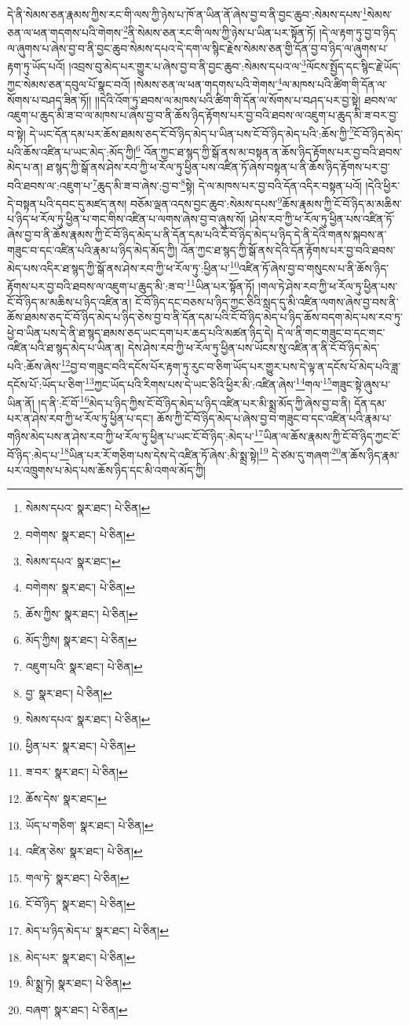 དེ་ནི་སེམས་ཅན་རྣམས་ཀྱིས་རང་གི་ལས་ཀྱི་ཉེས་པ་ཁོ་ན་ཡིན་ནོ་ཞེས་བྱ་བ་ནི་བྱང་ཆུབ་:སེམས་དཔས་\footnote{སེམས་དཔའ་  སྣར་ཐང་།  པེ་ཅིན། }སེམས་ཅན་ལ་ཕན་གདགས་པའི་གེགས་\footnote{བགེགས་  སྣར་ཐང་།  པེ་ཅིན། }ནི་སེམས་ཅན་རང་གི་ལས་ཀྱི་ཉེས་པ་ཡིན་པར་སྟོན་ཏོ། །དེ་ལ་རྟག་ཏུ་བྱ་བ་ཉིད་ལ་ཞུགས་པ་ཞེས་བྱ་བ་ནི་བྱང་ཆུབ་སེམས་དཔའ་དེ་དག་ལ་སྙིང་རྗེས་སེམས་ཅན་གྱི་དོན་བྱ་བ་ཉིད་ལ་ཞུགས་པ་རྟག་ཏུ་ཡོད་པའོ། །འབྲས་བུ་མེད་པར་གྱུར་པ་ཞེས་བྱ་བ་ནི་བྱང་ཆུབ་:སེམས་དཔའ་ལ་\footnote{སེམས་དཔའ་  སྣར་ཐང་། }ལོངས་སྤྱོད་དང་སྙིང་རྗེ་ཡོད་ཀྱང་སེམས་ཅན་དབུལ་པོ་སྣང་བའོ། །སེམས་ཅན་ལ་ཕན་གདགས་པའི་གེགས་\footnote{བགེགས་  སྣར་ཐང་།  པེ་ཅིན། }ལ་མཁས་པའི་ཚིག་གི་དོན་ལ་སོགས་པ་བཤད་ཟིན་ཏོ།། །།དེའི་འོག་ཏུ་ཐབས་ལ་མཁས་པའི་ཚིག་གི་དོན་ལ་སོགས་པ་བཤད་པར་བྱ་སྟེ། ཐབས་ལ་འཇུག་པ་ཆུད་མི་ཟ་བ་ལ་མཁས་པ་ཞེས་བྱ་བ་ནི་ཆོས་ཉིད་རྟོགས་པར་བྱ་བའི་ཐབས་ལ་འཇུག་པ་ཆུད་མི་ཟ་བར་བྱ་བ་སྟེ། དེ་ཡང་དོན་དམ་པར་ཆོས་ཐམས་ཅད་ངོ་བོ་ཉིད་མེད་པ་ཡིན་པས་ངོ་བོ་ཉིད་མེད་པའི་:ཆོས་ཀྱི་\footnote{ཆོས་ཀྱིས་  སྣར་ཐང་།  པེ་ཅིན། }ངོ་བོ་ཉིད་མེད་པའི་ཆོས་འཛིན་པ་ཡང་མེད་:མོད་ཀྱི།\footnote{མོད་ཀྱིས།  སྣར་ཐང་།  པེ་ཅིན། } འོན་ཀྱང་ཐ་སྙད་ཀྱི་སྒོ་ནས་མ་བསྟན་ན་ཆོས་ཉིད་རྟོགས་པར་བྱ་བའི་ཐབས་མེད་པ་ན། ཐ་སྙད་ཀྱི་སྒོ་ནས་ཤེས་རབ་ཀྱི་ཕ་རོལ་ཏུ་ཕྱིན་པས་འཛིན་ཏོ་ཞེས་བསྟན་པ་ནི་ཆོས་ཉིད་རྟོགས་པར་བྱ་བའི་ཐབས་ལ་:འཇུག་པ་\footnote{འཇུག་པའི་  སྣར་ཐང་།  པེ་ཅིན། }ཆུད་མི་ཟ་བ་ཞེས་:བྱ་བ་\footnote{བྱ་  སྣར་ཐང་།  པེ་ཅིན། }སྟེ། དེ་ལ་མཁས་པར་བྱ་བའི་དོན་འདིར་བསྟན་པའོ། །དེའི་ཕྱིར་དེ་བསྟན་པའི་དབང་དུ་མཛད་ནས། བཅོམ་ལྡན་འདས་བྱང་ཆུབ་:སེམས་དཔས་\footnote{སེམས་དཔའ་  སྣར་ཐང་།  པེ་ཅིན། }ཆོས་རྣམས་ཀྱི་ངོ་བོ་ཉིད་མ་མཆིས་པ་ཉིད་ཕ་རོལ་ཏུ་ཕྱིན་པ་གང་གིས་འཛིན་པ་ལགས་ཞེས་བྱ་བ་ཞུས་སོ། །ཤེས་རབ་ཀྱི་ཕ་རོལ་ཏུ་ཕྱིན་པས་འཛིན་ཏོ་ཞེས་བྱ་བ་ནི་ཆོས་རྣམས་ཀྱི་ངོ་བོ་ཉིད་མེད་པ་ནི་དོན་དམ་པའི་ངོ་བོ་ཉིད་མེད་པ་ཉིད་དེ་ནི་དེའི་གནས་སྐབས་ན་གཟུང་བ་དང་འཛིན་པའི་རྣམ་པ་ཉིད་མེད་མོད་ཀྱི། འོན་ཀྱང་ཐ་སྙད་ཀྱི་སྒོ་ནས་དེའི་དོན་རྟོགས་པར་བྱ་བའི་ཐབས་མེད་པས་འདིར་ཐ་སྙད་ཀྱི་སྒོ་ནས་ཤེས་རབ་ཀྱི་ཕ་རོལ་ཏུ་:ཕྱིན་པ་\footnote{ཕྱིན་པར་  སྣར་ཐང་།  པེ་ཅིན། }འཛིན་ཏོ་ཞེས་བྱ་བ་གསུངས་པ་ནི་ཆོས་ཉིད་རྟོགས་པར་བྱ་བའི་ཐབས་ལ་འཇུག་པ་ཆུད་མི་:ཟ་བ་\footnote{ཟ་བར་  སྣར་ཐང་།  པེ་ཅིན། }ཡིན་པར་སྟོན་ཏོ། །གལ་ཏེ་ཤེས་རབ་ཀྱི་ཕ་རོལ་ཏུ་ཕྱིན་པས་ངོ་བོ་ཉིད་མ་མཆིས་པ་ཉིད་འཛིན་ན། ངོ་བོ་ཉིད་དང་བཅས་པ་ཉིད་ཀྱང་ཅིའི་སླད་དུ་མི་འཛིན་ལགས་ཞེས་བྱ་བས་ནི་ཆོས་ཐམས་ཅད་ངོ་བོ་ཉིད་མེད་པ་ཉིད་ཅེས་བྱ་བ་ནི་དོན་དམ་པའི་ངོ་བོ་ཉིད་མེད་པ་ཉིད་ཆོས་བདག་མེད་པས་རབ་ཏུ་ཕྱེ་བ་ཡིན་པས་དེ་ནི་ཐ་སྙད་ཐམས་ཅད་ཡང་དག་པར་ཆད་པའི་མཚན་ཉིད་དེ། དེ་ལ་ནི་གང་གཟུང་བ་དང་གང་འཛིན་པའི་ཐ་སྙད་མེད་པ་ཡིན་ན། དེས་ཤེས་རབ་ཀྱི་ཕ་རོལ་ཏུ་ཕྱིན་པས་ཡོངས་སུ་འཛིན་ན་ནི་ངོ་བོ་ཉིད་མེད་པའི་:ཆོས་ཞེས་\footnote{ཆོས་དེས་  སྣར་ཐང་། }བྱ་བ་གཟུང་བའི་དངོས་པོར་རྟག་ཏུ་རུང་བ་ཅིག་ཡོད་པར་གྱུར་པས་དེ་ལྟ་ན་དངོས་པོ་མེད་པའི་ཟླ་དངོས་པོ་:ཡོད་པ་ཅིག་\footnote{ཡོད་པ་གཅིག་  སྣར་ཐང་།  པེ་ཅིན། }ཀྱང་ཡོད་པའི་རིགས་པས་དེ་ཡང་ཅིའི་ཕྱིར་མི་:འཛིན་ཞེས་\footnote{འཛིན་ཅེས་  སྣར་ཐང་།  པེ་ཅིན། }གལ་\footnote{གལ་ཏེ་  སྣར་ཐང་།  པེ་ཅིན། }གཟུང་སྟེ་ཞུས་པ་ཡིན་ནོ། །ད་ནི་:ངོ་བོ་\footnote{ངོ་བོ་ཉིད་  སྣར་ཐང་།  པེ་ཅིན། }མེད་པ་ཉིད་ཀྱིས་ངོ་བོ་ཉིད་མེད་པ་ཉིད་འཛིན་པར་མི་སྨྲ་མོད་ཀྱི་ཞེས་བྱ་བ་ནི། དོན་དམ་པར་ན་ཤེས་རབ་ཀྱི་ཕ་རོལ་ཏུ་ཕྱིན་པ་དང་། ཆོས་ཀྱི་ངོ་བོ་ཉིད་མེད་པ་ཞེས་བྱ་བ་གཟུང་བ་དང་འཛིན་པའི་རྣམ་པ་གཉིས་མེད་པས་ན་ཤེས་རབ་ཀྱི་ཕ་རོལ་ཏུ་ཕྱིན་པ་ཡང་ངོ་བོ་ཉིད་:མེད་པ་\footnote{མེད་པ་ཉིད་མེད་པ་  སྣར་ཐང་།  པེ་ཅིན། }ཡིན་ལ་ཆོས་རྣམས་ཀྱི་ངོ་བོ་ཉིད་ཀྱང་ངོ་བོ་ཉིད་:མེད་པ་\footnote{མེད་པར་  སྣར་ཐང་།  པེ་ཅིན། }ཡིན་པར་རོ་གཅིག་པས་དེས་དེ་འཛིན་ཏོ་ཞེས་:མི་སྨྲ་སྟེ།\footnote{མི་སྨྲ་ཏེ།  སྣར་ཐང་།  པེ་ཅིན། } དེ་ཙམ་དུ་གཞག་\footnote{བཞག་  སྣར་ཐང་།  པེ་ཅིན། }ན་ཆོས་ཉིད་རྣམ་པར་འཁྲུགས་པ་མེད་པས་ཆོས་ཉིད་དང་མི་འགལ་མོད་ཀྱི། 